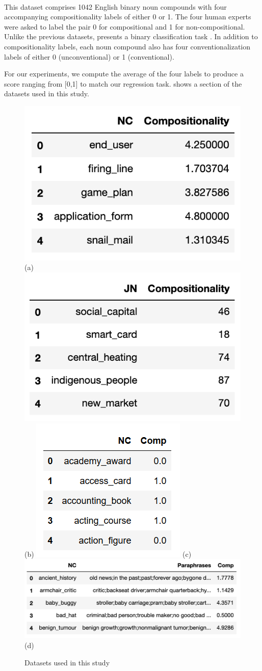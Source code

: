\paragraph{\farahm}
This dataset comprises 1042 English binary noun compounds with four accompanying compositionality labels of either 0 or 1. The four human experts were asked to label the pair 0 for compositional and 1 for non-compositional. Unlike the previous datasets, \farahm presents a binary classification task \citep{Farah2015c}. In addition to compositionality labels, each noun compound also has four conventionalization labels of either 0 (unconventional) or 1 (conventional). 

\noindent
For our experiments, we compute the average of the four labels to produce a score ranging from [0,1] to match our regression task.  shows a section of the datasets used in this study.
\begin{figure}[h!]
\centering
\includegraphics[width = .32\textwidth,]{Figures/reddy.PNG}
\small (a) \reddy
\includegraphics[width = .33\textwidth]{Figures/disco_j.PNG}
\small (b) \discoj
\includegraphics[width = .25\textwidth]{Figures/farahm_after.PNG}
\small (c) \farahm
\includegraphics[width = .7\textwidth]{Figures/ramisch.PNG}
\small (d) \ramisch
\caption{Datasets used in this study}
\label{fig:datasets}
\end{figure}


